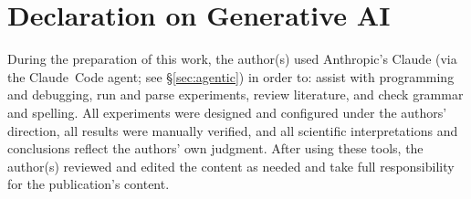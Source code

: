 \documentclass{ceurart}
\begin{document}
\section*{Declaration on Generative AI}
During the preparation of this work, the author(s) used Anthropic's Claude (via the
Claude~Code agent; see \S\ref{sec:agentic}) in order to: assist with programming
and debugging, run and parse experiments, review literature, and check grammar and
spelling. All experiments were designed and configured under the authors'
direction, all results were manually verified, and all scientific interpretations
and conclusions reflect the authors' own judgment. After using these tools, the
author(s) reviewed and edited the content as needed and take full responsibility
for the publication's content.


\end{document}
